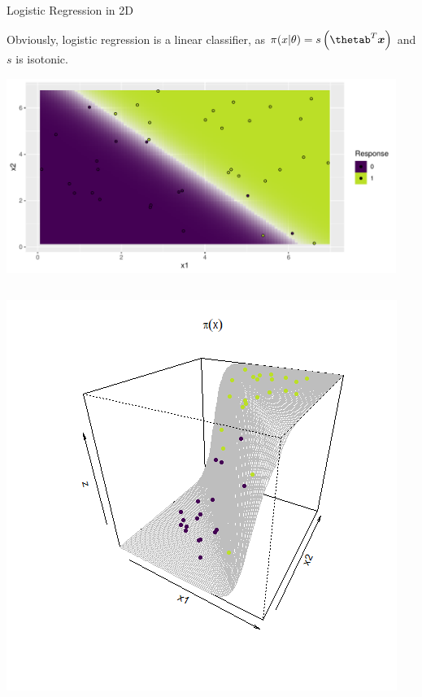 \documentclass[11pt,compress,t,notes=noshow, xcolor=table]{beamer}
\newenvironment{knitrout}{}{} %
\begin{document}
\begin{vbframe}{Logistic Regression in 2D}

Obviously, logistic regression is a linear classifier, as $\pixt = s\left( \thetab^T \xv \right)$ 
and $s$ is isotonic.

\lz
\begin{knitrout}\scriptsize
{}\color{fgcolor}

{\centering \includegraphics[width=0.95\textwidth]{figure/reg_class_log_6}  

}



\end{knitrout}

\framebreak

\begin{columns}[T]
\begin{column}{0.5\textwidth}
  \includegraphics[width=\textwidth]{figure_man/logreg-2vars-surface.png}
\end{column}
\begin{column}{0.5\textwidth}
\begin{knitrout}\scriptsize
{}\color{fgcolor}


\end{knitrout}
\end{column}
\end{columns}
\end{vbframe}
\end{document}
